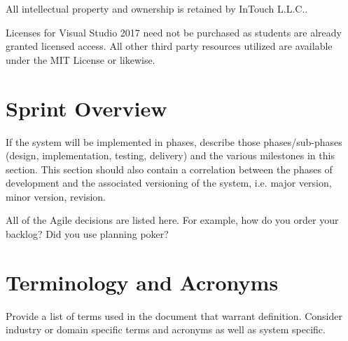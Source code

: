 All intellectual property and ownership is retained by InTouch L.L.C.. 

Licenses for Visual Studio 2017 need not be purchased as students are already granted licensed access. All other third party resources utilized are available under the MIT License or likewise. 


\section{Sprint  Overview}
If the system will be implemented in phases, describe those phases/sub-phases (design, 
implementation, testing, delivery) and the various milestones in this section. 
 This section should also contain a correlation between the phases of development 
and the associated versioning of the system, i.e. major version, minor version, 
revision. 

All of the Agile decisions are listed here.  For example, how do you order your backlog?   
Did you use planning poker?   

\section{Terminology and Acronyms}
Provide a list of terms used in the document that warrant definition.  Consider 
industry or domain specific terms and acronyms as well as system specific. 

